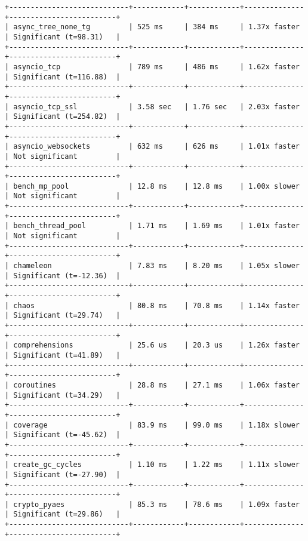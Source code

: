 \begin{code}
\begin{verbatim}
+----------------------------+------------+------------+--------------+-------------------------+
| async_tree_none_tg         | 525 ms     | 384 ms     | 1.37x faster | Significant (t=98.31)   |
+----------------------------+------------+------------+--------------+-------------------------+
| asyncio_tcp                | 789 ms     | 486 ms     | 1.62x faster | Significant (t=116.88)  |
+----------------------------+------------+------------+--------------+-------------------------+
| asyncio_tcp_ssl            | 3.58 sec   | 1.76 sec   | 2.03x faster | Significant (t=254.82)  |
+----------------------------+------------+------------+--------------+-------------------------+
| asyncio_websockets         | 632 ms     | 626 ms     | 1.01x faster | Not significant         |
+----------------------------+------------+------------+--------------+-------------------------+
| bench_mp_pool              | 12.8 ms    | 12.8 ms    | 1.00x slower | Not significant         |
+----------------------------+------------+------------+--------------+-------------------------+
| bench_thread_pool          | 1.71 ms    | 1.69 ms    | 1.01x faster | Not significant         |
+----------------------------+------------+------------+--------------+-------------------------+
| chameleon                  | 7.83 ms    | 8.20 ms    | 1.05x slower | Significant (t=-12.36)  |
+----------------------------+------------+------------+--------------+-------------------------+
| chaos                      | 80.8 ms    | 70.8 ms    | 1.14x faster | Significant (t=29.74)   |
+----------------------------+------------+------------+--------------+-------------------------+
| comprehensions             | 25.6 us    | 20.3 us    | 1.26x faster | Significant (t=41.89)   |
+----------------------------+------------+------------+--------------+-------------------------+
| coroutines                 | 28.8 ms    | 27.1 ms    | 1.06x faster | Significant (t=34.29)   |
+----------------------------+------------+------------+--------------+-------------------------+
| coverage                   | 83.9 ms    | 99.0 ms    | 1.18x slower | Significant (t=-45.62)  |
+----------------------------+------------+------------+--------------+-------------------------+
| create_gc_cycles           | 1.10 ms    | 1.22 ms    | 1.11x slower | Significant (t=-27.90)  |
+----------------------------+------------+------------+--------------+-------------------------+
| crypto_pyaes               | 85.3 ms    | 78.6 ms    | 1.09x faster | Significant (t=29.86)   |
+----------------------------+------------+------------+--------------+-------------------------+

\end{verbatim}
\end{code}

